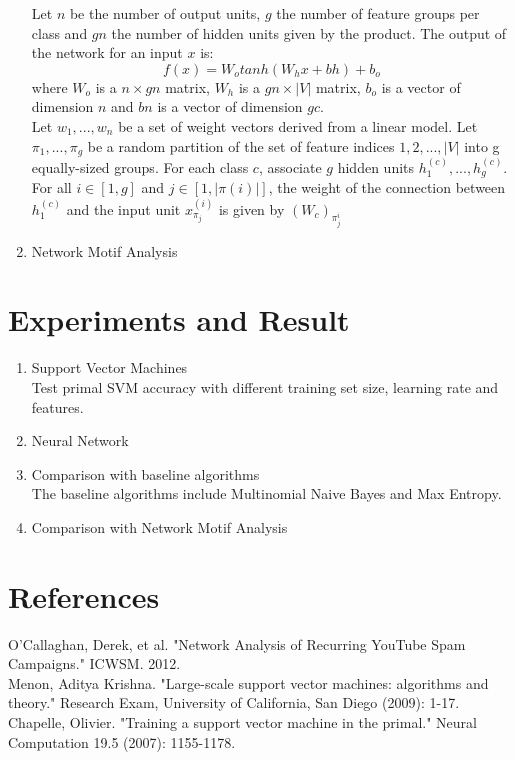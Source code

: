 \documentclass [a4paper, 11pt, oneside, final]{article}
\numberwithin{equation}{section}		%
\numberwithin{figure}{section}			%
\numberwithin{table}{section}				%
\begin{document}
\begin{enumerate}
Let $n$ be the number of output units, $g$ the number of feature groups per class and $gn$ the number of hidden units given by the product.
The output of the network for an input $x$ is:
$$ f(x) = W_{o}tanh(W_{h}x + bh) + b_{o}$$ where $W_{o}$ is a $n \times gn$ matrix, $W_{h}$ is a $gn \times |V|$ matrix, $b_{o}$ is a vector of dimension
$n$ and $bn$ is a vector of dimension $gc$.\\
Let ${w_{1}, . . . , w_{n}}$ be a set of weight vectors derived from a linear model. Let ${\pi_{1}, . . . , \pi_{g}}$ be a random partition of the set of feature indices ${1, 2, . . . , |V |}$  into g equally-sized groups. For each class $c$, associate $g$ hidden units ${h_{1}^{(c)}, . . . , h_{g}^{(c)}}$.
 For all $i \in [1, g]$ and $j \in [1, |\pi(i) |]$, the weight of the connection between $h_{1}^{(c)}$ and the input unit $x_{\pi_{j}}^{(i)} $ is given by $(W_{c})_{\pi_{j}^{i}}$
 
\item Network Motif Analysis
\end{enumerate}

\section{Experiments and Result}
\begin{enumerate}
\item Support Vector Machines \\
Test primal SVM accuracy with different training set size, learning rate and features.
\item Neural Network \\
\item Comparison with baseline algorithms \\
The baseline algorithms include Multinomial Naive Bayes and Max Entropy.
\item Comparison with Network Motif Analysis 
\end{enumerate}

\section{References}
\noindent O'Callaghan, Derek, et al. "Network Analysis of Recurring YouTube Spam Campaigns." ICWSM. 2012.\\
\noindent Menon, Aditya Krishna. "Large-scale support vector machines: algorithms and theory." Research Exam, University of California, San Diego (2009): 1-17.\\
\noindent Chapelle, Olivier. "Training a support vector machine in the primal." Neural Computation 19.5 (2007): 1155-1178.\\
\end{document}
